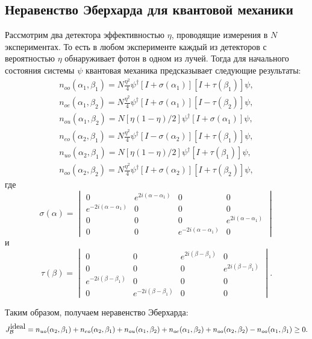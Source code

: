\documentclass[%
master,         %
subf,           %
href,           %
,times         %
]{disser}
\numberwithin{equation}{section}
\numberwithin{figure}{section}
\begin{document}
\subsection{Неравенство Эберхарда для квантовой механики}
Рассмотрим два детектора эффективностью $\eta$, проводящие измерения в $N$ экспериментах. То есть в любом эксперименте каждый из детекторов с вероятностью $\eta$ обнаруживает фотон в одном из лучей. Тогда для начального состояния системы $\psi$ квантовая механика предсказывает следующие результаты:
\begin{eqnarray} \label{eq:Eberhard_n_start}
n_{oo}(\alpha_1, \beta_1) = N\frac{\eta^2}{4}\psi^\dagger[I + \sigma(\alpha_1)][I + \tau(\beta_1)]\psi,\\
n_{oe}(\alpha_1, \beta_2) = N\frac{\eta^2}{4}\psi^\dagger[I + \sigma(\alpha_1)][I - \tau(\beta_2)]\psi,\\
n_{ou}(\alpha_1, \beta_2) = N[\eta(1 - \eta)/2]\psi^\dagger[I + \sigma(\alpha_1)]\psi,\\ \label{eq:Eberhard_n_ou}
n_{eo}(\alpha_2, \beta_1) = N\frac{\eta^2}{4}\psi^\dagger[I - \sigma(\alpha_2)][I + \tau(\beta_1)]\psi,\\
n_{uo}(\alpha_2, \beta_1) = N[\eta(1 - \eta)/2]\psi^\dagger[I + \tau(\beta_1)]\psi,\\ \label{eq:Eberhard_n_uo}
n_{oo}(\alpha_2, \beta_2) = N\frac{\eta^2}{4}\psi^\dagger[I + \sigma(\alpha_2)][I + \tau(\beta_2)]\psi, \label{eq:Eberhard_n_finish}
\end{eqnarray}
где 
\[
\sigma(\alpha) = 
\begin{vmatrix}
0 & e^{2i(\alpha - \alpha_1)} & 0 & 0\\
e^{-2i(\alpha - \alpha_1)} & 0 & 0 & 0\\
0 & 0 & 0 & e^{2i(\alpha - \alpha_1)}\\
0 & 0 & e^{-2i(\alpha - \alpha_1)} & 0
\end{vmatrix}
\] 
и 
\[
\tau(\beta) = 
\begin{vmatrix}
0 & 0 & e^{2i(\beta - \beta_1)} & 0\\
0 & 0 & 0 & e^{2i(\beta - \beta_1)}\\
e^{-2i(\beta - \beta_1)} & 0 & 0 & 0\\
0 & e^{-2i(\beta - \beta_1)} & 0 & 0
\end{vmatrix}.
\]

Таким образом, получаем неравенство Эберхарда:
\[
J_{\mathcal{B}}^{\mbox{ideal}} = n_{uo}(\alpha_2, \beta_1) + n_{eo}(\alpha_2, \beta_1) + n_{ou}(\alpha_1, \beta_2) \\
+ n_{oe}(\alpha_1, \beta_2) + n_{oo}(\alpha_2, \beta_2) - n_{oo}(\alpha_1, \beta_1) \geq 0.
\]
\end{document}
